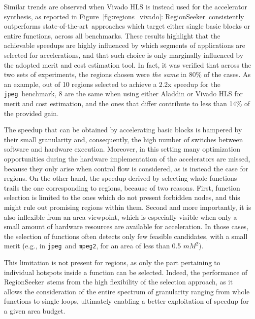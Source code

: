 \documentclass[]{usiinfthesis}
\newcommand{\rseeker}{{RegionSeeker}}
\newcommand{\SoTA}{{state-of-the-art}}
\newcommand{\jpeg}{\texttt{jpeg}}
\newcommand{\mpeg}{\texttt{mpeg2}}
\begin{document}
Similar trends are observed when Vivado HLS is instead used for the
accelerator synthesis, as reported in
Figure~\ref{fig:regions_vivado}: \rseeker\ consistently outperforms
\SoTA\ approaches which target either single basic blocks or
entire functions, across all benchmarks. These results 
highlight that the achievable speedups
are highly influenced by which segments of applications are selected
for accelerations, and that such choice is only marginally influenced
by the adopted merit and cost estimation tool. In fact, it was verified
that across the two sets of experiments, the regions chosen were
\emph{the same} in 80\% of the cases. As an example, out of 10 regions
selected to achieve a 2.2x speedup for the \jpeg\ benchmark, 8 are the
same when using either Aladdin or Vivado HLS for merit and cost
estimation, and the ones that differ contribute to less than 14\% of
the provided gain.\par

The speedup that can be obtained by accelerating basic blocks is
hampered by their small granularity and, consequently, the high number
of switches between software and hardware execution. Moreover, in this
setting many optimization opportunities
during the hardware implementation of the accelerators are missed,
because they only arise when control flow is considered, as is instead the case
for regions.
On the other hand, the speedup derived by selecting whole functions
trails the one corresponding to regions, because of two
reasons. First, function selection is limited to the ones which do not
present forbidden nodes, and this might rule out promising regions
within them. Second and more importantly, it is also inflexible from
an area viewpoint, which is especially visible when only a small amount of 
hardware resources are available for acceleration. In those cases, the
selection of functions often detects only few feasible candidates,
with a small merit (e.g., in \jpeg\ and \mpeg, for an area of less
than 0.5 $mM^2$).\par

This limitation is not present for regions, as only the part
pertaining to individual hotspots inside a function can be
selected. Indeed, the performance of \rseeker\ stems from the high
flexibility of the selection approach, as it allows the consideration of
the entire spectrum of granularity ranging from whole functions to
single loops, ultimately enabling a better exploitation of speedup for
a given area budget.
\end{document}
